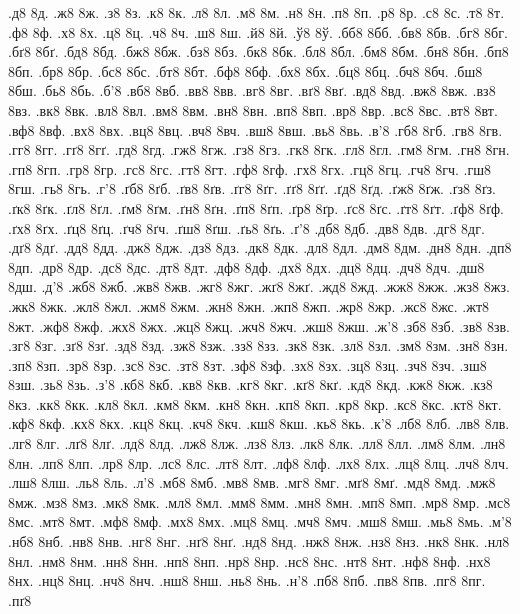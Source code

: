 {.д8
8д.
.ж8
8ж.
.з8
8з.
.к8
8к.
.л8
8л.
.м8
8м.
.н8
8н.
.п8
8п.
.р8
8р.
.с8
8с.
.т8
8т.
.ф8
8ф.
.х8
8х.
.ц8
8ц.
.ч8
8ч.
.ш8
8ш.
.й8
8й.
.ў8
8ў.
.бб8
8бб.
.бв8
8бв.
.бг8
8бг.
.бґ8
8бґ.
.бд8
8бд.
.бж8
8бж.
.бз8
8бз.
.бк8
8бк.
.бл8
8бл.
.бм8
8бм.
.бн8
8бн.
.бп8
8бп.
.бр8
8бр.
.бс8
8бс.
.бт8
8бт.
.бф8
8бф.
.бх8
8бх.
.бц8
8бц.
.бч8
8бч.
.бш8
8бш.
.бь8
8бь.
.б'8
.вб8
8вб.
.вв8
8вв.
.вг8
8вг.
.вґ8
8вґ.
.вд8
8вд.
.вж8
8вж.
.вз8
8вз.
.вк8
8вк.
.вл8
8вл.
.вм8
8вм.
.вн8
8вн.
.вп8
8вп.
.вр8
8вр.
.вс8
8вс.
.вт8
8вт.
.вф8
8вф.
.вх8
8вх.
.вц8
8вц.
.вч8
8вч.
.вш8
8вш.
.вь8
8вь.
.в'8
.гб8
8гб.
.гв8
8гв.
.гг8
8гг.
.гґ8
8гґ.
.гд8
8гд.
.гж8
8гж.
.гз8
8гз.
.гк8
8гк.
.гл8
8гл.
.гм8
8гм.
.гн8
8гн.
.гп8
8гп.
.гр8
8гр.
.гс8
8гс.
.гт8
8гт.
.гф8
8гф.
.гх8
8гх.
.гц8
8гц.
.гч8
8гч.
.гш8
8гш.
.гь8
8гь.
.г'8
.ґб8
8ґб.
.ґв8
8ґв.
.ґг8
8ґг.
.ґґ8
8ґґ.
.ґд8
8ґд.
.ґж8
8ґж.
.ґз8
8ґз.
.ґк8
8ґк.
.ґл8
8ґл.
.ґм8
8ґм.
.ґн8
8ґн.
.ґп8
8ґп.
.ґр8
8ґр.
.ґс8
8ґс.
.ґт8
8ґт.
.ґф8
8ґф.
.ґх8
8ґх.
.ґц8
8ґц.
.ґч8
8ґч.
.ґш8
8ґш.
.ґь8
8ґь.
.ґ'8
.дб8
8дб.
.дв8
8дв.
.дг8
8дг.
.дґ8
8дґ.
.дд8
8дд.
.дж8
8дж.
.дз8
8дз.
.дк8
8дк.
.дл8
8дл.
.дм8
8дм.
.дн8
8дн.
.дп8
8дп.
.др8
8др.
.дс8
8дс.
.дт8
8дт.
.дф8
8дф.
.дх8
8дх.
.дц8
8дц.
.дч8
8дч.
.дш8
8дш.
.д'8
.жб8
8жб.
.жв8
8жв.
.жг8
8жг.
.жґ8
8жґ.
.жд8
8жд.
.жж8
8жж.
.жз8
8жз.
.жк8
8жк.
.жл8
8жл.
.жм8
8жм.
.жн8
8жн.
.жп8
8жп.
.жр8
8жр.
.жс8
8жс.
.жт8
8жт.
.жф8
8жф.
.жх8
8жх.
.жц8
8жц.
.жч8
8жч.
.жш8
8жш.
.ж'8
.зб8
8зб.
.зв8
8зв.
.зг8
8зг.
.зґ8
8зґ.
.зд8
8зд.
.зж8
8зж.
.зз8
8зз.
.зк8
8зк.
.зл8
8зл.
.зм8
8зм.
.зн8
8зн.
.зп8
8зп.
.зр8
8зр.
.зс8
8зс.
.зт8
8зт.
.зф8
8зф.
.зх8
8зх.
.зц8
8зц.
.зч8
8зч.
.зш8
8зш.
.зь8
8зь.
.з'8
.кб8
8кб.
.кв8
8кв.
.кг8
8кг.
.кґ8
8кґ.
.кд8
8кд.
.кж8
8кж.
.кз8
8кз.
.кк8
8кк.
.кл8
8кл.
.км8
8км.
.кн8
8кн.
.кп8
8кп.
.кр8
8кр.
.кс8
8кс.
.кт8
8кт.
.кф8
8кф.
.кх8
8кх.
.кц8
8кц.
.кч8
8кч.
.кш8
8кш.
.кь8
8кь.
.к'8
.лб8
8лб.
.лв8
8лв.
.лг8
8лг.
.лґ8
8лґ.
.лд8
8лд.
.лж8
8лж.
.лз8
8лз.
.лк8
8лк.
.лл8
8лл.
.лм8
8лм.
.лн8
8лн.
.лп8
8лп.
.лр8
8лр.
.лс8
8лс.
.лт8
8лт.
.лф8
8лф.
.лх8
8лх.
.лц8
8лц.
.лч8
8лч.
.лш8
8лш.
.ль8
8ль.
.л'8
.мб8
8мб.
.мв8
8мв.
.мг8
8мг.
.мґ8
8мґ.
.мд8
8мд.
.мж8
8мж.
.мз8
8мз.
.мк8
8мк.
.мл8
8мл.
.мм8
8мм.
.мн8
8мн.
.мп8
8мп.
.мр8
8мр.
.мс8
8мс.
.мт8
8мт.
.мф8
8мф.
.мх8
8мх.
.мц8
8мц.
.мч8
8мч.
.мш8
8мш.
.мь8
8мь.
.м'8
.нб8
8нб.
.нв8
8нв.
.нг8
8нг.
.нґ8
8нґ.
.нд8
8нд.
.нж8
8нж.
.нз8
8нз.
.нк8
8нк.
.нл8
8нл.
.нм8
8нм.
.нн8
8нн.
.нп8
8нп.
.нр8
8нр.
.нс8
8нс.
.нт8
8нт.
.нф8
8нф.
.нх8
8нх.
.нц8
8нц.
.нч8
8нч.
.нш8
8нш.
.нь8
8нь.
.н'8
.пб8
8пб.
.пв8
8пв.
.пг8
8пг.
.пґ8
}

